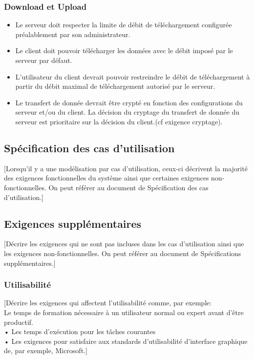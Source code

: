 \documentclass[10pt,a4paper]{report}
\begin{document}
\subsubsection{Download et Upload }

\begin{itemize}[label = $\triangleright$]

\item Le serveur doit respecter la limite de débit de téléchargement configurée préalablement par son administrateur.
\item Le client doit pouvoir télécharger les données avec le débit imposé par le serveur par défaut.
\item L'utilisateur du client devrait pouvoir restreindre le débit de téléchargement à partir du débit maximal de téléchargement autorisé par le serveur. 

\item Le transfert de donnée devrait être crypté en fonction des configurations du serveur et/ou du client. La décision du cryptage du transfert de donnée du serveur est prioritaire sur la décision du client.(cf exigence cryptage).

\end{itemize}

\subsection{Spécification des cas d’utilisation}
[Lorsqu’il y a une modélisation par cas d’utilisation, ceux-ci décrivent la majorité des exigences fonctionnelles du système ainsi que certaines exigences non-fonctionnelles. On peut référer au document de Spécification des cas d’utilisation.]

\subsection{Exigences supplémentaires}
[Décrire les exigences qui ne sont pas incluses dans les cas d’utilisation ainsi que les exigences non-fonctionnelles. On peut référer au document de Spécifications supplémentaires.]

\subsubsection{Utilisabilité}
[Décrire les exigences qui affectent l’utilisabilité comme, par exemple:\\
	Le temps de formation nécessaire à un utilisateur normal ou expert avant d’être productif.\\
•	Les temps d’exécution pour les tâches courantes\\
•	Les exigences pour satisfaire aux standards d’utilisabilité d’interface graphique de, par exemple, Microsoft.]
\end{document}
